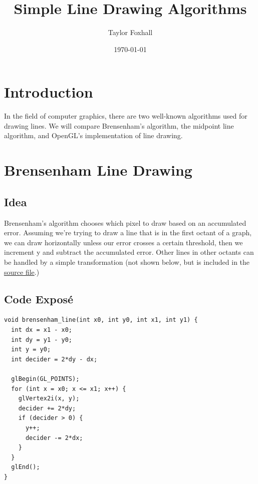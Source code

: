 \documentclass{article}
\author{Taylor Foxhall}
\date{\today}
\title{Simple Line Drawing Algorithms}
\begin{document}
\maketitle

\section{Introduction}
\label{sec:orgheadline1}
In the field of computer graphics, there are two well-known algorithms used for drawing lines. We will compare
Brensenham's algorithm, the midpoint line algorithm, and OpenGL's implementation of line drawing.
\section{Brensenham Line Drawing}
\label{sec:orgheadline5}
\subsection{Idea}
\label{sec:orgheadline2}
Brensenham's algorithm chooses which pixel to draw based on an accumulated error. Assuming we're trying to draw
a line that is in the first octant of a graph, we can draw horizontally unless our error crosses a certain threshold,
then we increment y and subtract the accumulated error. Other lines in other octants can be handled by a simple
transformation (not shown below, but is included in the \href{main.cpp}{source file}.)
\subsection{Code Exposé}
\label{sec:orgheadline3}
\begin{verbatim}
void brensenham_line(int x0, int y0, int x1, int y1) {
  int dx = x1 - x0;
  int dy = y1 - y0;
  int y = y0;
  int decider = 2*dy - dx;

  glBegin(GL_POINTS);
  for (int x = x0; x <= x1; x++) {
    glVertex2i(x, y);
    decider += 2*dy;
    if (decider > 0) {
      y++;
      decider -= 2*dx;
    }
  }
  glEnd();
}
\end{verbatim}
\end{document}
